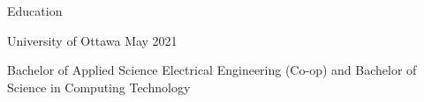 \documentclass{resume} %
\begin{document}




\begin{rSection}{Education}

\begin{rSubsection}{University of Ottawa} {May 2021}{}

\item Bachelor of Applied Science Electrical Engineering (Co-op) and Bachelor of Science in Computing Technology
\end{rSubsection}
\end{rSection}


\end{document}
